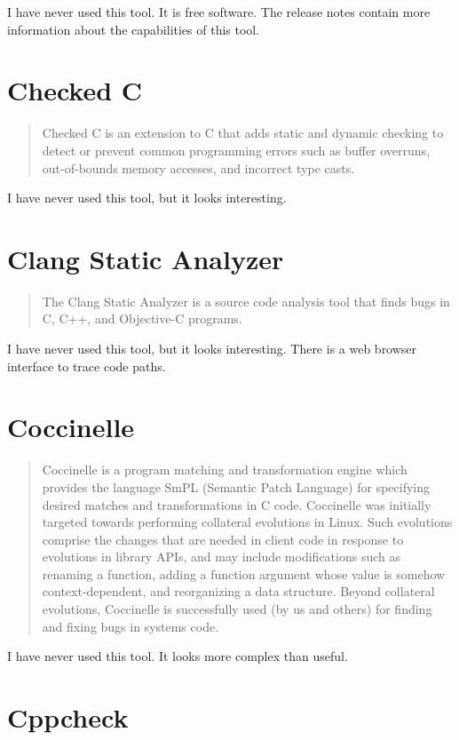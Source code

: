 \documentclass[12pt]{article}
\begin{document}
I have never used this tool. It is free software. The release notes
contain more information about the capabilities of this tool.
\cite{blast}
\section{Checked C}
\begin{quote}
Checked C is an extension to C that adds static and dynamic checking to
detect or prevent common programming errors such as buffer overruns,
out-of-bounds memory accesses, and incorrect type casts.
\end{quote}

I have never used this tool, but it looks interesting.
\cite{checkedc}
\section{Clang Static Analyzer}
\begin{quote}
The Clang Static Analyzer is a source code analysis tool that finds bugs
in C, C++, and Objective-C programs.
\end{quote}

I have never used this tool, but it looks interesting. There is a web
browser interface to trace code paths.
\cite{clang}
\section{Coccinelle}

\begin{quote}
Coccinelle is a program matching and transformation engine which
provides the language SmPL (Semantic Patch Language) for specifying
desired matches and transformations in C code. Coccinelle was initially
targeted towards performing collateral evolutions in Linux. Such
evolutions comprise the changes that are needed in client code in
response to evolutions in library APIs, and may include modifications
such as renaming a function, adding a function argument whose value is
somehow context-dependent, and reorganizing a data structure. Beyond
collateral evolutions, Coccinelle is successfully used (by us and others)
for finding and fixing bugs in systems code.
\end{quote}

I have never used this tool. It looks more complex than useful.
\cite{coccinelle}
\section{Cppcheck}
\end{document}
